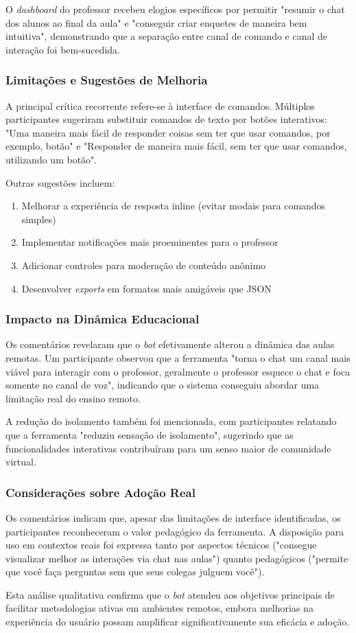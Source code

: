 O \textit{dashboard} do professor recebeu elogios específicos por permitir
"resumir o chat dos alunos ao final da aula" e "conseguir criar enquetes de
maneira bem intuitiva", demonstrando que a separação entre canal de comando e
canal de interação foi bem-sucedida.

\subsubsection{Limitações e Sugestões de Melhoria}

A principal crítica recorrente refere-se à interface de comandos. Múltiplos
participantes sugeriram substituir comandos de texto por botões interativos:
"Uma maneira mais fácil de responder coisas sem ter que usar comandos, por
exemplo, botão" e "Responder de maneira mais fácil, sem ter que usar comandos,
utilizando um botão".

Outras sugestões incluem:
\begin{enumerate}
\item Melhorar a experiência de resposta inline (evitar modais para comandos
simples)
\item Implementar notificações mais proeminentes para o professor
\item Adicionar controles para moderação de conteúdo anônimo
\item Desenvolver \textit{exports} em formatos mais amigáveis que JSON
\end{enumerate}

\subsubsection{Impacto na Dinâmica Educacional}

Os comentários revelaram que o \textit{bot} efetivamente alterou a dinâmica das
aulas remotas. Um participante observou que a ferramenta "torna o chat um canal
mais viável para interagir com o professor, geralmente o professor esquece o
chat e foca somente no canal de voz", indicando que o sistema conseguiu abordar
uma limitação real do ensino remoto.

A redução do isolamento também foi mencionada, com participantes relatando que
a ferramenta "reduziu sensação de isolamento", sugerindo que as funcionalidades
interativas contribuíram para um senso maior de comunidade virtual.

\subsubsection{Considerações sobre Adoção Real}

Os comentários indicam que, apesar das limitações de interface identificadas, os
participantes reconheceram o valor pedagógico da ferramenta. A disposição para
uso em contextos reais foi expressa tanto por aspectos técnicos ("consegue
visualizar melhor as interações via chat nas aulas") quanto pedagógicos
("permite que você faça perguntas sem que seus colegas julguem você").

Esta análise qualitativa confirma que o \textit{bot} atendeu aos objetivos
principais de facilitar metodologias ativas em ambientes remotos, embora
melhorias na experiência do usuário possam amplificar significativamente sua
eficácia e adoção.
